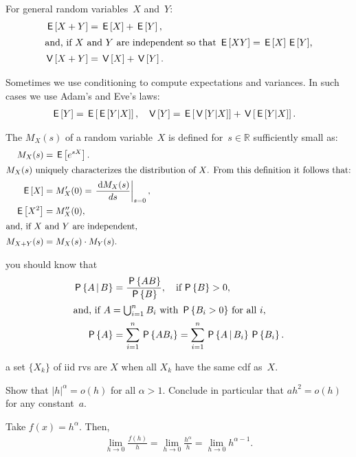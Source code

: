 \documentclass[stochastic-or.tex]{subfiles}
\begin{document}
For general random variables~$X$ and~$Y$:
\begin{align*}
  \,\mathsf{E}\left[X+Y\right] &= \,\mathsf{E}\left[X\right] + \,\mathsf{E}\left[Y\right], \\
\intertext{and, if~$X$ and~$Y$ are independent so that $\,\mathsf{E}\left[XY\right] = \,\mathsf{E}\left[X\right] \,\mathsf{E}\left[Y\right]$,}
  \,\mathsf{V}\left[X+Y\right] &= \,\mathsf{V}\left[X\right] + \,\mathsf{V}\left[Y\right].
\end{align*}

Sometimes we use conditioning to compute  expectations and variances. In such cases we use Adam's and Eve's laws:
\begin{align*}
\,\mathsf{E}\left[Y\right] &= \,\mathsf{E}\left[\,\mathsf{E}\left[Y|X\right]\right], & \,\mathsf{V}\left[Y\right] &= \,\mathsf{E}\left[\,\mathsf{V}\left[Y|X\right]\right] + \,\mathsf{V}\left[\,\mathsf{E}\left[Y|X\right]\right].
\end{align*}


The  $M_X(s)$ of a random variable~$X$ is defined for~$s\in \mathbb{R}$ sufficiently small as:
\begin{subequations}
\begin{align}
 M_X(s) &= \,\mathsf{E}\left[e^{s X}\right]. \label{eq:75}\\
\intertext{$M_X(s)$  uniquely characterizes the distribution of~$X$. From this definition it follows that:}
 \,\mathsf{E}\left[X\right] &= M_{X}'(0) = \left.\frac{\,\textrm{d}M_{X}(s)}{d s}\right|_{s=0},\label{eq:69}\\
\,\mathsf{E}\left[X^2\right] &= M_{X}''(0), \label{eq:64}\\
\intertext{and, if~$X$ and~$Y$ are independent,}
M_{X+Y}(s) &= M_X(s)\cdot M_Y(s). \label{eq:73}
\end{align}
\end{subequations}


 you should know that
\begin{subequations}\label{eq:70}
\begin{align}
\,\mathsf{P}\left\{A\,\middle|\, B\right\} & = \frac{\,\mathsf{P}\left\{AB\right\}}{\,\mathsf{P}\left\{B\right\}}, \quad\text{if}\, \,\mathsf{P}\left\{B\right\}>0, \\
\intertext{and, if $A=\bigcup_{i=1}^n B_i$ with $\,\mathsf{P}\left\{B_i>0\right\}$ for all~$i$,}
 \,\mathsf{P}\left\{A\right\} &= \sum_{i=1}^n \,\mathsf{P}\left\{A B_i\right\} = \sum_{i=1}^n \,\mathsf{P}\left\{A\,\middle|\, B_i\right\} \,\mathsf{P}\left\{B_i\right\}.
\end{align}
\end{subequations}

 a set $\{X_k\}$ of iid rvs are  $X$ when all $X_k$ have the same cdf as~$X$.

\begin{exercise}\label{ex:12}
Show that $|h|^{\alpha} = o(h)$ for all $\alpha > 1$. Conclude in particular that $a h^{2} = o(h)$ for any constant~$a$.
\begin{solution}
Take $f(x) = h^{\alpha}$. Then,
\begin{align*}
\lim_{h\to 0} \frac{f(h)}{h} =
\lim_{h\to 0} \frac{h^{\alpha}}{h} =
\lim_{h\to 0} h^{\alpha-1}.
\end{align*}
\end{solution}
\end{exercise}
\end{document}

